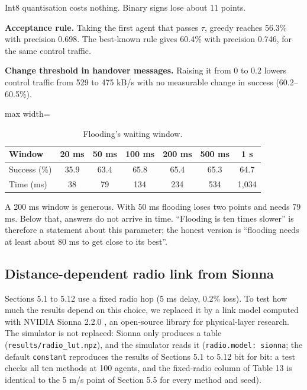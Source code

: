 \documentclass[journal]{IEEEtran}
\begin{document}
Int8 quantisation costs nothing. Binary signs lose about 11 points.

\textbf{Acceptance rule.} Taking the first agent that passes $\tau$, greedy reaches 56.3\% with precision 0.698. The best-known rule gives 60.4\% with precision 0.746, for the same control traffic.

\textbf{Change threshold in handover messages.} Raising it from 0 to 0.2 lowers control traffic from 529 to 475 kB/s with no measurable change in success (60.2--60.5\%).

\begin{table}[!t]
\centering
\caption{Flooding's waiting window.}
\label{tab:11}
\footnotesize
\begin{adjustbox}{max width=\columnwidth}
\begin{tabular}{lcccccc}
\toprule
Window & 20 ms & 50 ms & 100 ms & 200 ms & 500 ms & 1 s \\
\midrule
Success (\%) & 35.9 & 63.4 & 65.8 & 65.4 & 65.3 & 64.7 \\
Time (ms) & 38 & 79 & 134 & 234 & 534 & 1,034 \\
\bottomrule
\end{tabular}
\end{adjustbox}
\end{table}

A 200 ms window is generous. With 50 ms flooding loses two points and needs 79 ms. Below that, answers do not arrive in time. ``Flooding is ten times slower'' is therefore a statement about this parameter; the honest version is ``flooding needs at least about 80 ms to get close to its best''.

\subsection{Distance-dependent radio link from Sionna}
Sections 5.1 to 5.12 use a fixed radio hop (5 ms delay, 0.2\% loss). To test how much the results depend on this choice, we replaced it by a link model computed with NVIDIA Sionna 2.2.0 \cite{ref18}, an open-source library for physical-layer research. The simulator is not replaced: Sionna only produces a table (\texttt{results/\allowbreak radio\_\allowbreak lut.npz}), and the simulator reads it (\texttt{radio.model: sionna}; the default \texttt{constant} reproduces the results of Sections 5.1 to 5.12 bit for bit: a test checks all ten methods at 100 agents, and the fixed-radio column of Table 13 is identical to the 5 m/s point of Section 5.5 for every method and seed).
\end{document}
